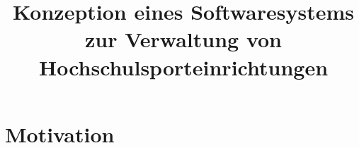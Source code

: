 \documentclass[article,dr=phil,type=drfinal,colorback,accentcolor=tud2b]{tudreport}
\title{Konzeption eines Softwaresystems zur Verwaltung von Hochschulsporteinrichtungen}
\begin{document}
  \maketitle
  
  \tableofcontents 
  \clearpage
  
  \listoffigures 
  \clearpage
  
  \listoftables 
  \clearpage
  
	\section {Motivation}


	 
	
	 
	
	 
	
	 
	
	 

	
	
	


   
  
  
\end{document}
